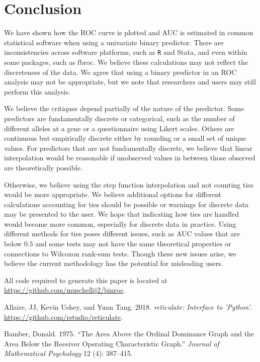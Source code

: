 \documentclass[smallextended]{svjour3}       %
\begin{document}
\hypertarget{conclusion}{%
\section{Conclusion}\label{conclusion}}

We have shown how the ROC curve is plotted and AUC is estimated in
common statistical software when using a univariate binary predictor.
There are inconsistencies across software platforms, such as \texttt{R}
and Stata, and even within some packages, such as
{\selectfont fbroc}. We believe these calculations may not
reflect the discreteness of the data. We agree that using a binary
predictor in an ROC analysis may not be appropriate, but we note that
researchers and users may still perform this analysis.

We believe the critiques depend partially of the nature of the
predictor. Some predictors are fundamentally discrete or categorical,
such as the number of different alleles at a gene or a questionnaire
using Likert scales. Others are continuous but empirically discrete
either by rounding or a small set of unique values. For predictors that
are not fundamentally discrete, we believe that linear interpolation
would be reasonable if unobserved values in between those observed are
theoretically possible.

Otherwise, we believe using the step function interpolation and not
counting ties would be more appropriate. We believe additional options
for different calculations accounting for ties should be possible or
warnings for discrete data may be presented to the user. We hope that
indicating how ties are handled would become more common, especially for
discrete data in practice. Using different methods for ties poses
different issues, such as AUC values that are below \(0.5\) and some
tests may not have the same theoretical properties or connections to
Wilcoxon rank-sum tests. Though these new issues arise, we believe the
current methodology has the potential for misleading users.

All code required to generate this paper is located at
\url{https://github.com/muschellij2/binroc}.

\hypertarget{refs}{}
\leavevmode\hypertarget{ref-reticulate}{}%
Allaire, JJ, Kevin Ushey, and Yuan Tang. 2018. \emph{reticulate:
Interface to 'Python'}. \url{https://github.com/rstudio/reticulate}.

\leavevmode\hypertarget{ref-bamber1975area}{}%
Bamber, Donald. 1975. ``The Area Above the Ordinal Dominance Graph and
the Area Below the Receiver Operating Characteristic Graph.''
\emph{Journal of Mathematical Psychology} 12 (4): 387--415.
\end{document}
